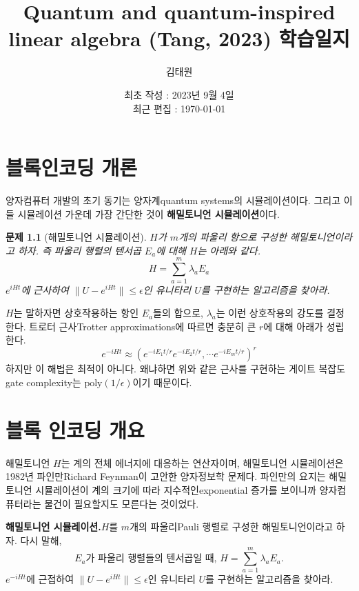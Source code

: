 \documentclass[a4paper,atbegshi,chapter]{oblivoir}
\title{\Large Quantum and quantum-inspired linear algebra (Tang, 2023) 학습일지}
\author{김태원}
\date{최초 작성 : 2023년 9월 4일 \\ 최근 편집 : \today}
\newtheorem{prob}{문제}[chapter]
\begin{document}
\maketitle
\chapter{블록인코딩 개론}
양자컴퓨터 개발의 초기 동기는 양자계{\footnotesize quantum systems}의
시뮬레이션이다. 그리고 이들 시뮬레이션 가운데 가장 간단한 것이 \textbf{해밀토니언
시뮬레이션}이다.
\begin{prob}[해밀토니언 시뮬레이션]
  $H$가 $m$개의 파울리 항으로 구성한 해밀토니언이라고 하자. 즉 파울리 행렬의
  텐서곱 $E_a$에 대해 $H$는 아래와 같다.
  \[
    H=\sum_{a=1}^m\lambda_aE_a
  \]
  $e^{iHt}$에 근사하여 $\|U-e^{iHt}\|\leq\epsilon$인 유니타리 $U$를 구현하는
  알고리즘을 찾아라.
\end{prob}
$H$는 말하자면 상호작용하는 항인 $E_a$들의 합으로, $\lambda_a$는 이런 상호작용의
강도를 결정한다. 트로터 근사{\footnotesize Trotter approximations}에 따르면
충분히 큰 $r$에 대해 아래가 성립한다.
\[
  e^{-iHt}\approx(e^{-iE_1t/r}e^{-iE_2t/r},\cdots e^{-iE_mt/r})^r
\]
하지만 이 해법은 최적이 아니다. 왜냐하면 위와 같은 근사를 구현하는 게이트 
복잡도{\footnotesize gate complexity}는 $\textrm{poly}(1/\epsilon)$이기 
때문이다.
\chapter{블록 인코딩 개요}
해밀토니언 $H$는 계의 전체 에너지에 대응하는 연산자이며, 해밀토니언 시뮬레이션은
1982년 파인만{\tiny Richard Feynman}이 고안한 양자정보학 문제다. 파인만의 요지는
해밀토니언 시뮬레이션이 계의 크기에 따라 지수적인{\tiny exponential} 증가를
보이니까 양자컴퓨터라는 물건이 필요할지도 모른다는 것이었다.
\begin{mdframed}
\textbf{해밀토니언 시뮬레이션.}\quad $H$를 $m$개의 파울리{\tiny Pauli} 행렬로
구성한 해밀토니언이라고 하자. 다시 말해,
    \[
      E_a\textrm{가 파울리 행렬들의 텐서곱일 때, }H = \sum_{a=1}^m\lambda_a E_a.
    \]
$e^{-iHt}$에 근접하여 $\|U-e^{iHt}\|\leq\epsilon$인 유니타리 $U$를 구현하는
알고리즘을 찾아라.
\end{mdframed}
\end{document}
